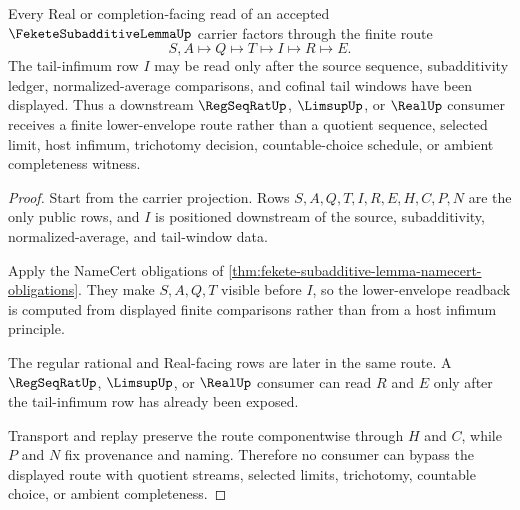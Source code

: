 \begin{theorem}
\label{thm:fekete-subadditive-lemma-tail-infimum-route}
Every Real or completion-facing read of an accepted $\FeketeSubadditiveLemmaUp$ carrier factors through the finite route
$$
S,A\longmapsto Q\longmapsto T\longmapsto I\longmapsto R\longmapsto E .
$$
The tail-infimum row $I$ may be read only after the source sequence, subadditivity ledger, normalized-average comparisons, and cofinal tail windows have been displayed. Thus a downstream $\RegSeqRatUp$, $\LimsupUp$, or $\RealUp$ consumer receives a finite lower-envelope route rather than a quotient sequence, selected limit, host infimum, trichotomy decision, countable-choice schedule, or ambient completeness witness.
\end{theorem}
\begin{proof}
Start from the carrier projection. Rows $S,A,Q,T,I,R,E,H,C,P,N$ are the only public rows, and $I$ is positioned downstream of the source, subadditivity, normalized-average, and tail-window data.

Apply the NameCert obligations of \autoref{thm:fekete-subadditive-lemma-namecert-obligations}. They make $S,A,Q,T$ visible before $I$, so the lower-envelope readback is computed from displayed finite comparisons rather than from a host infimum principle.

The regular rational and Real-facing rows are later in the same route. A $\RegSeqRatUp$, $\LimsupUp$, or $\RealUp$ consumer can read $R$ and $E$ only after the tail-infimum row has already been exposed.

Transport and replay preserve the route componentwise through $H$ and $C$, while $P$ and $N$ fix provenance and naming. Therefore no consumer can bypass the displayed route with quotient streams, selected limits, trichotomy, countable choice, or ambient completeness.
\end{proof}


